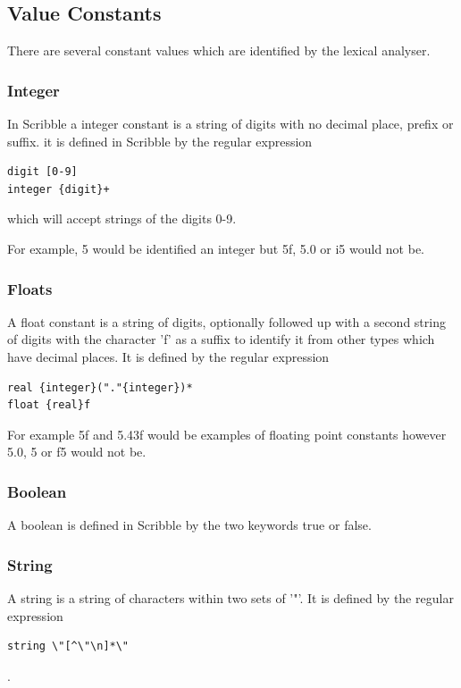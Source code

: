 \documentclass[]{final_report}
\begin{document}
\subsection{Value Constants}

There are several constant values which are identified by the lexical analyser.

\subsubsection{Integer}

In Scribble a integer constant is a string of digits with no decimal place, prefix or suffix. it is defined in Scribble by the regular expression 

\begin{verbatim}
digit [0-9]
integer {digit}+
\end{verbatim}

which will accept strings of the digits 0-9.

For example, 5 would be identified an integer but 5f, 5.0 or i5 would not be.

\subsubsection{Floats}

A float constant is a string of digits, optionally followed up with a second string of digits with the character 'f' as a suffix to identify it from other types which have decimal places. It is defined by the regular expression
\begin{verbatim}
real {integer}("."{integer})*
float {real}f
\end{verbatim}

For example 5f and 5.43f would be examples of floating point constants however 5.0, 5 or f5 would not be.

\subsubsection{Boolean}

A boolean is defined in Scribble by the two keywords true or false.

\subsubsection{String}

A string is a string of characters within two sets of '"'. It is defined by the regular expression \begin{verbatim}
string \"[^\"\n]*\"
\end{verbatim}.
\end{document}
